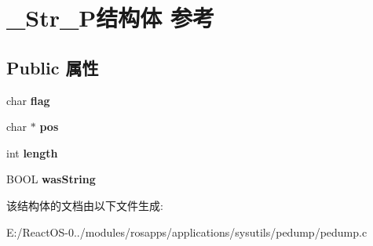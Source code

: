 \hypertarget{struct___str___p}{}\section{\+\_\+\+Str\+\_\+\+P结构体 参考}
\label{struct___str___p}
\subsection*{Public 属性}
\begin{DoxyCompactItemize}
\item 
\mbox{\label{struct___str___p_a74783cce78c8995def5edd8825823899}} 
char {\bfseries flag}
\item 
\mbox{\label{struct___str___p_abf50116d38ac6b9f3e88522a08624f54}} 
char $\ast$ {\bfseries pos}
\item 
\mbox{\label{struct___str___p_a4b54fb9fc3a59c65ebfa9e125036c7ea}} 
int {\bfseries length}
\item 
\mbox{\label{struct___str___p_a822091a52cf255a1ce3d05c5af90da07}} 
B\+O\+OL {\bfseries was\+String}
\end{DoxyCompactItemize}


该结构体的文档由以下文件生成\+:\begin{DoxyCompactItemize}
\item 
E\+:/\+React\+O\+S-\/0../modules/rosapps/applications/sysutils/pedump/pedump.\+c\end{DoxyCompactItemize}
